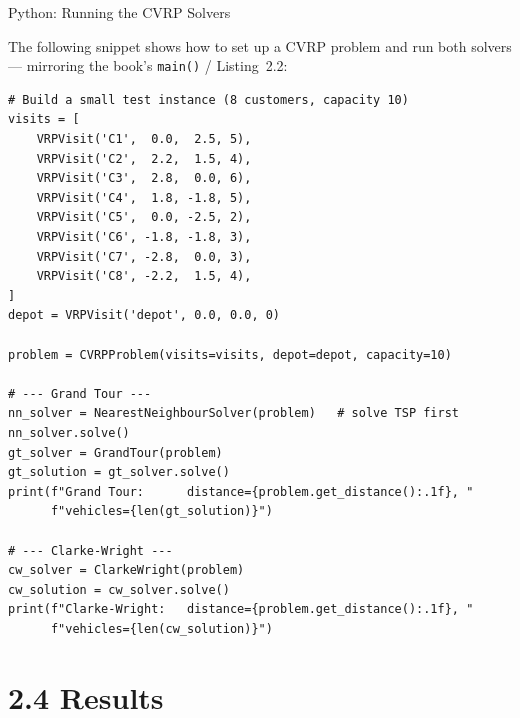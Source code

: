 \documentclass[aspectratio=169,10pt]{beamer}
\begin{document}
\begin{frame}[fragile]{Python: Running the CVRP Solvers}

  The following snippet shows how to set up a CVRP problem and run both
  solvers --- mirroring the book's \texttt{main()} / Listing~2.2:

\begin{lstlisting}[caption={Using the Grand Tour and Clarke--Wright solvers}]
# Build a small test instance (8 customers, capacity 10)
visits = [
    VRPVisit('C1',  0.0,  2.5, 5),
    VRPVisit('C2',  2.2,  1.5, 4),
    VRPVisit('C3',  2.8,  0.0, 6),
    VRPVisit('C4',  1.8, -1.8, 5),
    VRPVisit('C5',  0.0, -2.5, 2),
    VRPVisit('C6', -1.8, -1.8, 3),
    VRPVisit('C7', -2.8,  0.0, 3),
    VRPVisit('C8', -2.2,  1.5, 4),
]
depot = VRPVisit('depot', 0.0, 0.0, 0)

problem = CVRPProblem(visits=visits, depot=depot, capacity=10)

# --- Grand Tour ---
nn_solver = NearestNeighbourSolver(problem)   # solve TSP first
nn_solver.solve()
gt_solver = GrandTour(problem)
gt_solution = gt_solver.solve()
print(f"Grand Tour:      distance={problem.get_distance():.1f}, "
      f"vehicles={len(gt_solution)}")

# --- Clarke-Wright ---
cw_solver = ClarkeWright(problem)
cw_solution = cw_solver.solve()
print(f"Clarke-Wright:   distance={problem.get_distance():.1f}, "
      f"vehicles={len(cw_solution)}")
\end{lstlisting}

\end{frame}

\section{2.4 Results}
\end{document}
